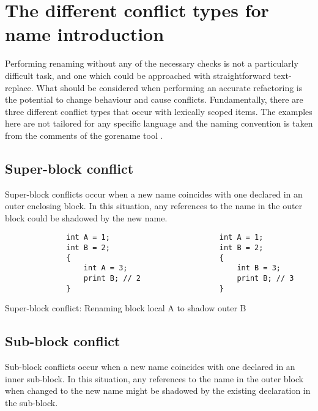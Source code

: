 

\section{The different conflict types for name introduction}\label{S:different}
Performing renaming without any of the necessary checks is not a particularly difficult task, and one which could be approached with straightforward text-replace. What should be considered when performing an accurate refactoring is the potential to change behaviour and cause conflicts. Fundamentally, there are three different conflict types that occur with lexically scoped items. The examples here are not tailored for any specific language and the naming convention is taken from the comments of the gorename tool \cite{gorename15}.

\subsection{Super-block conflict}
Super-block conflicts occur when a new name coincides with one declared in an outer enclosing block. In this situation, any references to the name in the outer block could be shadowed by the new name.

\begin{fig}[H]
\begin{verbatim}
              int A = 1;                         int A = 1;
              int B = 2;                         int B = 2;
              {                                  {
                  int A = 3;                         int B = 3;
                  print B; // 2                      print B; // 3
              }                                  }
\end{verbatim}
\caption{Super-block conflict: Renaming block local A to shadow outer B}
\label{Fig:super}
\end{fig}

\subsection{Sub-block conflict}
Sub-block conflicts occur when a new name coincides with one declared in an inner sub-block. In this situation, any references to the name in the outer block when changed to the new name might be shadowed by the existing declaration in the sub-block.

